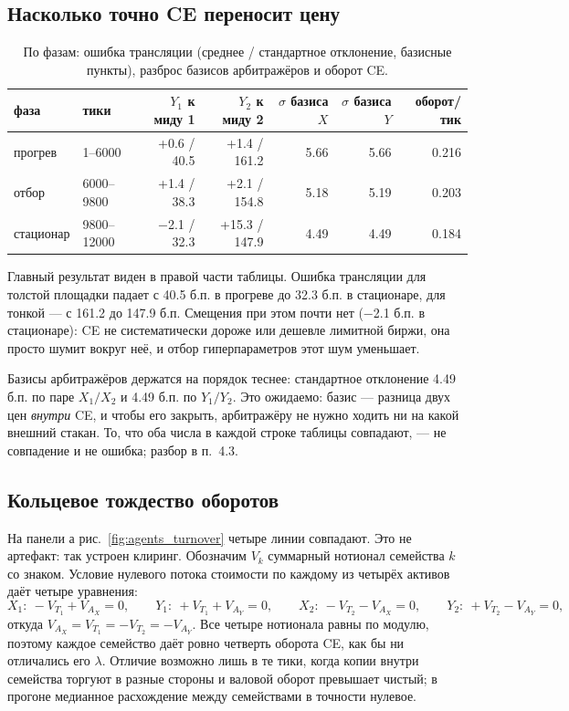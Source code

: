 \documentclass[11pt,a4paper]{article}
\begin{document}
\subsection{Насколько точно CE переносит цену}

\begin{table}[H]
\centering
\caption{По фазам: ошибка трансляции (среднее / стандартное отклонение,
базисные пункты), разброс базисов арбитражёров и оборот CE.}
\small
\begin{tabular}{llrrrrr}
\toprule
фаза & тики & \(Y_1\) к миду 1 & \(Y_2\) к миду 2 &
\(\sigma\) базиса \(X\) & \(\sigma\) базиса \(Y\) & оборот/тик \\
\midrule
прогрев & 1--6000 & +0.6 / 40.5 & +1.4 / 161.2 & 5.66 & 5.66 & 0.216 \\
отбор & 6000--9800 & +1.4 / 38.3 & +2.1 / 154.8 & 5.18 & 5.19 & 0.203 \\
стационар & 9800--12000 & −2.1 / 32.3 & +15.3 / 147.9 & 4.49 & 4.49 & 0.184 \\
\bottomrule
\end{tabular}
\end{table}

Главный результат виден в правой части таблицы. Ошибка трансляции для
толстой площадки падает с 40.5 б.п. в прогреве до 32.3
б.п. в стационаре, для тонкой --- с 161.2 до 147.9 б.п.
Смещения при этом почти нет (−2.1 б.п. в стационаре): CE не
систематически дороже или дешевле лимитной биржи, она просто шумит вокруг
неё, и отбор гиперпараметров этот шум уменьшает.

Базисы арбитражёров держатся на порядок теснее: стандартное отклонение
4.49 б.п. по паре \(X_1/X_2\) и 4.49 б.п. по
\(Y_1/Y_2\). Это ожидаемо: базис --- разница двух цен \emph{внутри} CE, и
чтобы его закрыть, арбитражёру не нужно ходить ни на какой внешний стакан.
То, что оба числа в каждой строке таблицы совпадают, --- не совпадение
и не ошибка; разбор в п.~4.3.

\subsection{Кольцевое тождество оборотов}

На панели а рис.~\ref{fig:agents_turnover} четыре линии совпадают. Это не
артефакт: так устроен клиринг. Обозначим \(V_k\) суммарный нотионал
семейства \(k\) со знаком. Условие нулевого потока стоимости по каждому из
четырёх активов даёт четыре уравнения:
\[
  X_1:\ -V_{T_1} + V_{A_X} = 0,\qquad
  Y_1:\ +V_{T_1} + V_{A_Y} = 0,\qquad
  X_2:\ -V_{T_2} - V_{A_X} = 0,\qquad
  Y_2:\ +V_{T_2} - V_{A_Y} = 0,
\]
откуда \(V_{A_X} = V_{T_1} = -V_{T_2} = -V_{A_Y}\). Все четыре нотионала
равны по модулю, поэтому каждое семейство даёт ровно четверть оборота CE,
как бы ни отличались его \(\lambda\). Отличие возможно лишь в те тики,
когда копии внутри семейства торгуют в разные стороны и валовой оборот
превышает чистый; в прогоне медианное расхождение между семействами
в точности нулевое.
\end{document}
